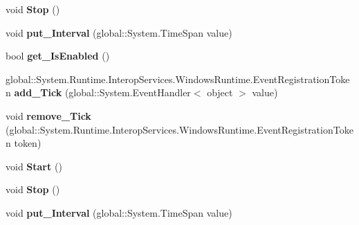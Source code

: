 \begin{DoxyCompactItemize}
void {\bfseries Stop} ()
\item 
\mbox{\label{interface_windows_1_1_u_i_1_1_xaml_1_1_i_dispatcher_timer_a31cd041ad06e9800dd7028428f45ffce}} 
void {\bfseries put\+\_\+\+Interval} (global\+::\+System.\+Time\+Span value)
\item 
\mbox{\label{interface_windows_1_1_u_i_1_1_xaml_1_1_i_dispatcher_timer_a67b6e2e9a009502e0c91978ec3e1ffc6}} 
bool {\bfseries get\+\_\+\+Is\+Enabled} ()
\item 
\mbox{\label{interface_windows_1_1_u_i_1_1_xaml_1_1_i_dispatcher_timer_a51cc49d4e074524b59fd3824af1b971f}} 
global\+::\+System.\+Runtime.\+Interop\+Services.\+Windows\+Runtime.\+Event\+Registration\+Token {\bfseries add\+\_\+\+Tick} (global\+::\+System.\+Event\+Handler$<$ object $>$ value)
\item 
\mbox{\label{interface_windows_1_1_u_i_1_1_xaml_1_1_i_dispatcher_timer_ad50c6aef1abbae667daedf72bb953263}} 
void {\bfseries remove\+\_\+\+Tick} (global\+::\+System.\+Runtime.\+Interop\+Services.\+Windows\+Runtime.\+Event\+Registration\+Token token)
\item 
\mbox{\label{interface_windows_1_1_u_i_1_1_xaml_1_1_i_dispatcher_timer_a684008a3b69e0e2bdfff696ff246aff6}} 
void {\bfseries Start} ()
\item 
\mbox{\label{interface_windows_1_1_u_i_1_1_xaml_1_1_i_dispatcher_timer_ab54d6b697589bdb58c5d2ae6f4cfafcc}} 
void {\bfseries Stop} ()
\item 
\mbox{\label{interface_windows_1_1_u_i_1_1_xaml_1_1_i_dispatcher_timer_a31cd041ad06e9800dd7028428f45ffce}} 
void {\bfseries put\+\_\+\+Interval} (global\+::\+System.\+Time\+Span value)
\item 
\mbox{\label{interface_windows_1_1_u_i_1_1_xaml_1_1_i_dispatcher_timer_a67b6e2e9a009502e0c91978ec3e1ffc6}} 

\end{DoxyCompactItemize}
